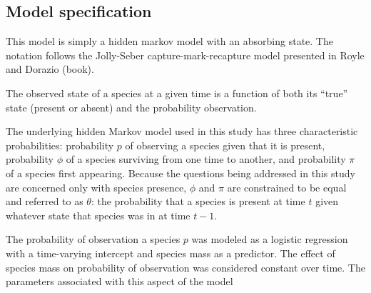 \documentclass[12pt,letterpaper]{article}
\begin{document}



\subsection*{Model specification}





This model is simply a hidden markov model with an absorbing state. The notation follows the Jolly-Seber capture-mark-recapture model presented in Royle and Dorazio (book).

The observed state of a species at a given time is a function of both its ``true'' state (present or absent) and the probability observation. 



The underlying hidden Markov model used in this study has three characteristic probabilities: probability \(p\) of observing a species given that it is present, probability \(\phi\) of a species surviving from one time to another, and probability \(\pi\) of a species first appearing. Because the questions being addressed in this study are concerned only with species presence, \(\phi\) and \(\pi\) are constrained to be equal and referred to as \(\theta\): the probability that a species is present at time \(t\) given whatever state that species was in at time \(t - 1\).

The probability of observation a species \(p\) was modeled as a logistic regression with a time-varying intercept and species mass as a predictor. The effect of species mass on probability of observation was considered constant over time. The parameters associated with this aspect of the model 
\end{document}
